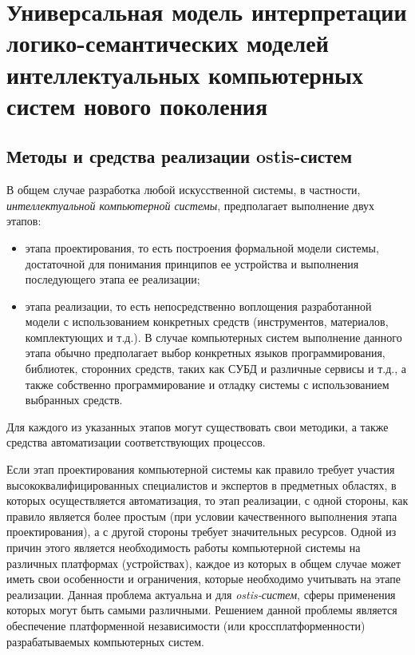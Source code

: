 \chapter{Универсальная модель интерпретации логико-семантических моделей интеллектуальных компьютерных систем нового поколения}
\label{chapter_interpreter}


\section{Методы и средства реализации ostis-систем}

В общем случае разработка любой искусственной системы, в частности, \textit{интеллектуальной компьютерной системы}, предполагает выполнение двух этапов:
\begin{itemize}
\item этапа проектирования, то есть построения формальной модели системы, достаточной для понимания принципов ее устройства и выполнения последующего этапа ее реализации;
\item этапа реализации, то есть непосредственно воплощения разработанной модели с использованием конкретных средств (инструментов, материалов, комплектующих и т.д.). В случае компьютерных систем выполнение данного этапа обычно предполагает выбор конкретных языков программирования, библиотек, сторонних средств, таких как СУБД и различные сервисы и т.д., а также собственно программирование и отладку системы с использованием выбранных средств.
\end{itemize}

Для каждого из указанных этапов могут существовать свои методики, а также средства автоматизации соответствующих процессов.

Если этап проектирования компьютерной системы как правило требует участия высококвалифицированных специалистов и экспертов в предметных областях, в которых осуществляется автоматизация, то этап реализации, с одной стороны, как правило является более простым (при условии качественного выполнения этапа проектирования), а с другой стороны требует значительных ресурсов. Одной из причин этого является необходимость работы компьютерной системы на различных платформах (устройствах), каждое из которых в общем случае может иметь свои особенности и ограничения, которые необходимо учитывать на этапе реализации. Данная проблема актуальна и для \textit{ostis-систем}, сферы применения которых могут быть самыми различными. Решением данной проблемы является обеспечение платформенной независимости (или кроссплатформенности) разрабатываемых компьютерных систем.

